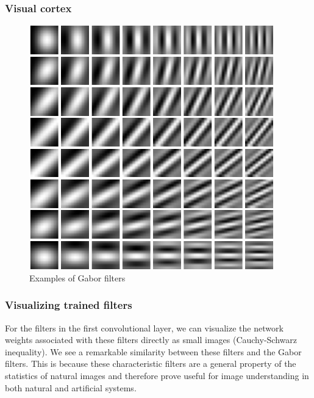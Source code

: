 \documentclass{beamer}
\begin{document}
\begin{frame}
    \frametitle{Visual cortex}
    \begin{figure}
        \caption{Examples of Gabor filters}
        \includegraphics[height=0.7\textheight]{Figure_11.pdf}
    \end{figure}
\end{frame}

\begin{frame}
    \frametitle{Visualizing trained filters}
    For the filters in the first convolutional layer, we can visualize the network weights associated with these filters directly as small images (Cauchy-Schwarz inequality).
    \bigbreak
    We see a remarkable similarity between these filters and the Gabor filters. This is because these characteristic filters are a general property of the statistics of natural images and therefore prove useful for image understanding in both natural and artificial systems.
\end{frame}
\end{document}
